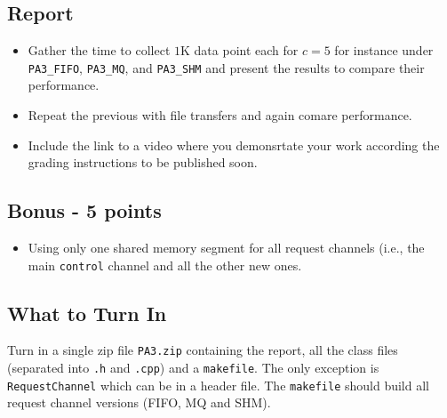 \documentclass[12pt]{extarticle}
\begin{document}
\subsection*{Report}
\begin{itemize}
    \item Gather the time to collect $1$K data point each for $c=5$ for instance under \texttt{PA3\_FIFO}, \texttt{PA3\_MQ}, and \texttt{PA3\_SHM} and present the results to compare their performance.
    \item Repeat the previous with file transfers and again comare performance. 
    \item Include the link to a video where you demonsrtate your work according the grading instructions to be published soon.
\end{itemize}

\subsection*{Bonus - 5 points}
\begin{itemize}
	\item Using only one shared memory segment for all request channels (i.e., the main \texttt{control} channel and all the other new ones.
\end{itemize}

\subsection*{What to Turn In}
Turn in a single zip file \texttt{PA3.zip} containing the report, all the class files (separated into \texttt{.h} and \texttt{.cpp}) and a \texttt{makefile}. The only exception is \texttt{RequestChannel} which can be in a header file. The \texttt{makefile} should build all request channel versions (FIFO, MQ and SHM).
\end{document}
